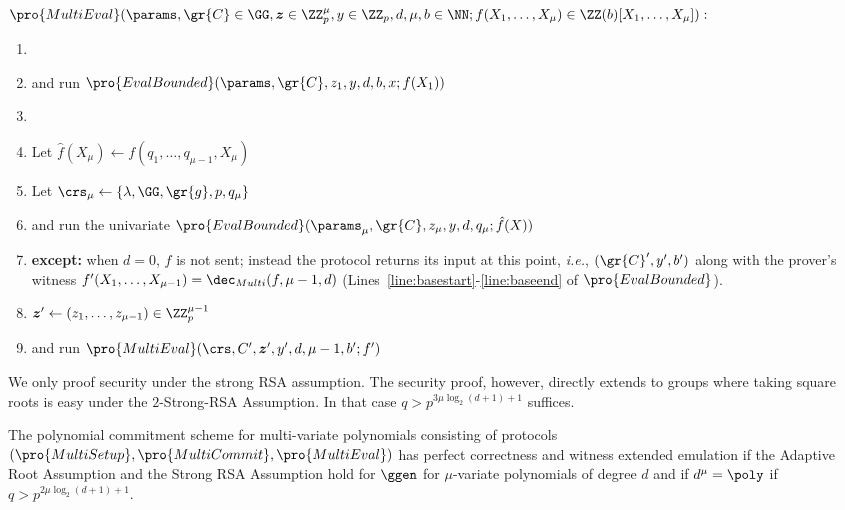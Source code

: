  \begin{mdframed}
\begin{minipage}{\textwidth}
			$\pro{MultiEval}(\params, \gr{C}\in \GG, \boldsymbol{z}\in \ZZ^\mu_p,y \in \ZZ_p, d,\mu,b \in \NN; f(X_1,\dots,X_\mu)\in \ZZ(b)[X_1, \ldots, X_\mu]) :$
			\begin{enumerate}[nolistsep]
			\item {} 
			\item \pcind[1] \prover and \verifier run $\pro{EvalBounded}(\params,\gr{C},z_1,y,d,b,x;f(X_1))$ 
			\item \pcelse
			\item \pcind[1] Let $\hat{f}(X_\mu)\gets f(q_1,\dots,q_{\mu-1},X_\mu)$
			\item \pcind[1] Let $\crs_\mu \gets \{\lambda,\GG,\gr{g},p,q_\mu\}$
			\item \pcind[1] \prover and \verifier run the univariate $\pro{EvalBounded}(\params_\mu,\gr{C},z_\mu,y,d,q_\mu;\hat{f}(X))$
			\item \pcind[2] \textbf{except:} when $d=0$, $f$ is not sent; instead the protocol returns its input at this point, \emph{i.e.}, $(\gr{C}',y',b')$ along with the prover's witness $f'(X_1,\dots,X_{\mu-1})=\dec_{Multi}(f,\mu-1,d)$ (Lines~\ref{line:basestart}-\ref{line:baseend} of $\pro{EvalBounded}$). 
			\item \pcind[1]$\boldsymbol{z}'\gets (z_1,\dots,z_{\mu-1})\in \ZZ_p^{\mu-1}$
			\item \pcind[1]\prover and \verifier run $\pro{MultiEval}(\crs,C',\boldsymbol{z}',y',d,\mu-1,b';f')$
		    \end{enumerate}
      \end{minipage}
\end{mdframed}
We only proof security under the strong RSA assumption. The security proof, however, directly extends to groups where taking square roots is easy under the $2$-Strong-RSA Assumption. In that case $q>p^{3\mu \log_2(d+1)+1}$ suffices.
\begin{theorem}
	The polynomial commitment scheme for multi-variate polynomials consisting of protocols $(\pro{MultiSetup},\pro{MultiCommit},\pro{MultiEval})$ has perfect correctness and witness extended emulation if the Adaptive Root Assumption and the Strong RSA Assumption hold for $\ggen$ for $\mu$-variate polynomials of degree $d$ and if $d^\mu=\poly$ if $q> p^{2 \mu \log_2(d+1)+1}$.
\end{theorem}
